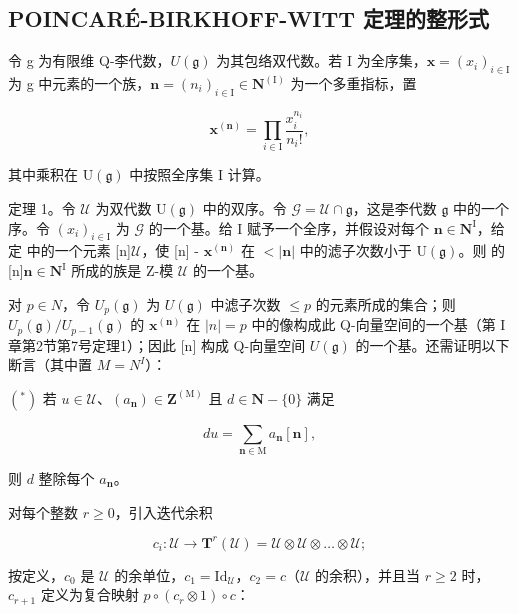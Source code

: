 \subsection{POINCAR\'E-BIRKHOFF-WITT 定理的整形式}

令 g 为有限维 Q-李代数，\(U(\mathfrak{g})\) 为其包络双代数。若 I 为全序集，\(\mathbf{x} = (x_i)_{i \in \mathrm{I}}\) 为 g 中元素的一个族，\(\mathbf{n} = (n_i)_{i \in \mathrm{I}} \in \mathbf{N}^{(\mathrm{I})}\) 为一个多重指标，置

\[
\mathbf {x} ^ {(\mathbf {n})} = \prod_ {i \in \mathrm{I}} \frac {x _ {i} ^ {n _ {i}}}{n _ {i} !},\tag{5}
\]

其中乘积在 \(\mathrm{U}(\mathfrak{g})\) 中按照全序集 I 计算。

定理 1。令 \(\mathcal{U}\) 为双代数 \(\mathrm{U}(\mathfrak{g})\) 中的双序。令 \(\mathcal{G} = \mathcal{U} \cap \mathfrak{g}\)，这是李代数 \(\mathfrak{g}\) 中的一个序。令 \((x_i)_{i \in \mathrm{I}}\) 为 \(\mathcal{G}\) 的一个基。给 I 赋予一个全序，并假设对每个 \(\mathbf{n} \in \mathbf{N}^{\mathrm{I}}\)，给定 { 中的一个元素 }[{n}]\(\mathcal{U}\)，使 {[}n{]} - \(\mathbf{x}^{(\mathbf{n})}\) 在 \(< |\mathbf{n}|\) 中的滤子次数小于 \(\mathrm{U}(\mathfrak{g})\)。则 { 的 }[{n}]\(\mathbf{n} \in \mathbf{N}^{\mathrm{I}}\) 所成的族是 Z-模 \(\mathcal{U}\) 的一个基。

对 \(p \in N\)，令 \(U_{p}(\mathfrak{g})\) 为 \(U(\mathfrak{g})\) 中滤子次数 \(\leq p\) 的元素所成的集合；则 \(U_{p}(\mathfrak{g}) / U_{p-1}(\mathfrak{g})\) 的 \(\mathbf{x}^{(\mathbf{n})}\) 在 \(|n| = p\) 中的像构成此 Q-向量空间的一个基（第 I 章第2节第7号定理1）；因此 {[}n{]} 构成 Q-向量空间 \(U(\mathfrak{g})\) 的一个基。还需证明以下断言（其中置 \(M = N^{I}\)）：

\((^{*})\) 若 \(u\in \mathcal{U}\)、\((a_{\mathbf{n}})\in \mathbf{Z}^{(\mathrm{M})}\) 且 \(d\in \mathbf{N} - \{0\}\) 满足

\[
d u = \sum_ {\mathbf {n} \in \mathrm{M}} a _ {\mathbf {n}} [ \mathbf {n} ],\tag{6}
\]

则 \(d\) 整除每个 \(a_{\mathbf{n}}\)。

对每个整数 \(r \geq 0\)，引入迭代余积

\[
c _ {i}: \mathcal {U} \rightarrow \mathbf {T} ^ {r} (\mathcal {U}) = \mathcal {U} \otimes \mathcal {U} \otimes \dots \otimes \mathcal {U};
\]

按定义，\(c_0\) 是 \(\mathcal{U}\) 的余单位，\(c_1 = \mathrm{Id}_{\mathcal{U}}\)，\(c_2 = c\)（\(\mathcal{U}\) 的余积），并且当 \(r \geq 2\) 时，\(c_{r+1}\) 定义为复合映射 \(p \circ (c_r \otimes 1) \circ c\)：

